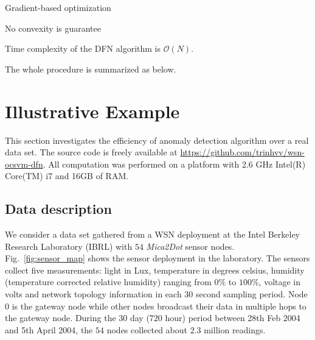 \documentclass[conference]{IEEEtran}
\theoremstyle{problemstyle}
\begin{document}
Gradient-based optimization

No convexity is guarantee

Time complexity of the DFN algorithm is $\mathcal{O}(N)$. 

The whole procedure is summarized as below.

\section{Illustrative Example}\label{sec:Illustrative}

This section investigates the efficiency of anomaly detection algorithm over a real data set. The source code is freely available at \url{https://github.com/trinhvv/wsn-ocsvm-dfn}. All computation was performed on a platform with 2.6 GHz Intel(R) Core(TM) i7 and 16GB of RAM.

\subsection{Data description}

We consider a data set gathered from a WSN deployment at the Intel Berkeley Research Laboratory (IBRL) \cite{Buonadonna2005} with $54$ \emph{Mica2Dot} sensor nodes. Fig.~\ref{fig:sensor_map} shows the sensor deployment in the laboratory. The sensors collect five measurements: light in Lux, temperature in degrees celsius, humidity (temperature corrected relative humidity) ranging from $0\%$ to $100\%$, voltage in volts and network topology information in each $30$ second sampling period. Node $0$ is the gateway node while other nodes broadcast their data in multiple hops to the gateway node. During the $30$ day ($720$ hour) period between 28th Feb 2004 and 5th April 2004, the $54$ nodes collected about $2.3$ million readings.
\end{document}
